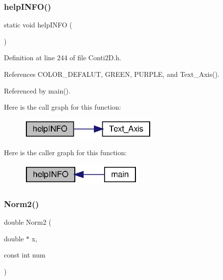\subsubsection{help\+I\+N\+F\+O()}
{\footnotesize\ttfamily static void help\+I\+N\+FO (\begin{DoxyParamCaption}{ }\end{DoxyParamCaption})\hspace{0.3cm}{\ttfamily [static]}}



Definition at line 244 of file Conti2\+D.\+h.



References C\+O\+L\+O\+R\+\_\+\+D\+E\+F\+A\+L\+UT, G\+R\+E\+EN, P\+U\+R\+P\+LE, and Text\+\_\+\+Axis().



Referenced by main().

Here is the call graph for this function\+:\nopagebreak
\begin{figure}[H]
\begin{center}
\leavevmode
\includegraphics[width=198pt]{Conti2D_8h_ae9ea2d2408945cb9ad31ee7f03ca183a_ae9ea2d2408945cb9ad31ee7f03ca183a_cgraph}
\end{center}
\end{figure}
Here is the caller graph for this function\+:\nopagebreak
\begin{figure}[H]
\begin{center}
\leavevmode
\includegraphics[width=176pt]{Conti2D_8h_ae9ea2d2408945cb9ad31ee7f03ca183a_ae9ea2d2408945cb9ad31ee7f03ca183a_icgraph}
\end{center}
\end{figure}
\mbox{\label{Conti2D_8h_a98827c14ed7072c96834f20205c7a916_a98827c14ed7072c96834f20205c7a916}} 
\subsubsection{Norm2()}
{\footnotesize\ttfamily double Norm2 (\begin{DoxyParamCaption}\item[{double $\ast$}]{x,  }\item[{const int}]{num }\end{DoxyParamCaption})}



